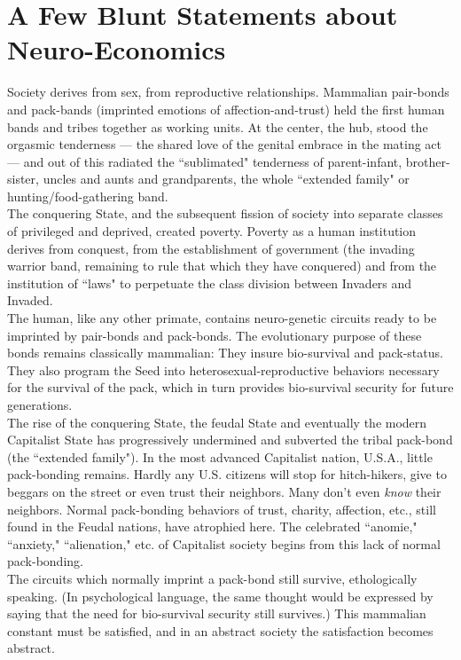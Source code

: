 \chapter{A Few Blunt Statements about Neuro-Economics}

Society derives from sex, from reproductive relationships. Mammalian pair-bonds and pack-bands (imprinted emotions of affection-and-trust) held the first human bands and tribes together as working units. At the center, the hub, stood the orgasmic tenderness --- the shared love of the genital embrace in the mating act --- and out of this radiated the ``sublimated" tenderness of parent-infant, brother-sister, uncles and aunts and grandparents, the whole ``extended family" or hunting/food-gathering band.\\
The conquering State, and the subsequent fission of society into separate classes of privileged and deprived, created poverty. Poverty as a human institution derives from conquest, from the establishment of government (the invading warrior band, remaining to rule that which they have conquered) and from the institution of ``laws" to perpetuate the class division between Invaders and Invaded.\\
The human, like any other primate, contains neuro-genetic circuits ready to be imprinted by pair-bonds and pack-bonds. The evolutionary purpose of these bonds remains classically mammalian: They insure bio-survival and pack-status. They also program the Seed into heterosexual-reproductive behaviors necessary for the survival of the pack, which in turn provides bio-survival security for future generations.\\
The rise of the conquering State, the feudal State and eventually the modern Capitalist State has progressively undermined and subverted the tribal pack-bond (the ``extended family"). In the most advanced Capitalist nation, U.S.A., little pack-bonding remains. Hardly any U.S. citizens will stop for hitch-hikers, give to beggars on the street or even trust their neighbors. Many don't even \emph{know} their neighbors. Normal pack-bonding behaviors of trust, charity, affection, etc., still found in the Feudal nations, have atrophied here. The celebrated ``anomie," ``anxiety," ``alienation," etc. of Capitalist society begins from this lack of normal pack-bonding.\\
The circuits which normally imprint a pack-bond still survive, ethologically speaking. (In psychological language, the same thought would be expressed by saying that the need for bio-survival security still survives.) This mammalian constant must be satisfied, and in an abstract society the satisfaction becomes abstract.\\
